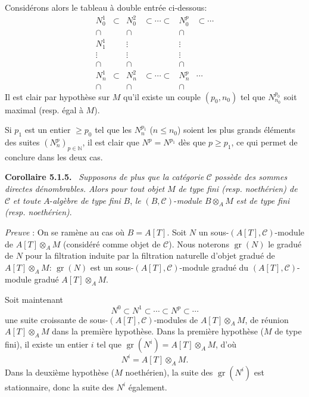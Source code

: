\documentclass[11pt]{article}
\newenvironment{statement}[1]{\par\medskip\noindent\textbf{#1.}\ }{\par\medskip}
\providecommand{\gr}{\operatorname{gr}}
\providecommand{\gr}{\operatorname{gr}}
\providecommand{\gr}{\operatorname{gr}}
\begin{document}
Considérons alors le tableau à double entrée ci-dessous:
\[
\begin{array}{cccccc}
N_0^1&\subset&N_0^2&\subset\cdots\subset&N_0^p&\subset\cdots\\
\cap&&\cap&&\cap\\
N_1^1&&\vdots&&\vdots\\
\vdots&&\vdots&&\vdots\\
\cap&&\cap&&\cap\\
N_n^1&\subset&N_n^2&\subset\cdots\subset&N_n^p&\cdots\\
\cap&&\cap&&\cap
\end{array}
\]
Il est clair par hypothèse sur \(M\) qu'il existe un couple \((p_0,n_0)\) tel que \(N^{p_0}_{n_0}\) soit maximal (resp. égal à \(M\)).

Si \(p_1\) est un entier \(\ge p_0\) tel que les \(N_n^{p_1}\) (\(n\le n_0\)) soient les plus grands éléments des suites \((N_n^p)_{p\in\mathbb N}\), il est clair que \(N^p=N^{p_1}\) dès que \(p\ge p_1\), ce qui permet de conclure dans les deux cas.

\begin{statement}{Corollaire 5.1.5}
\emph{Supposons de plus que la catégorie} \(\mathcal C\) \emph{possède des sommes directes dénombrables. Alors pour tout objet} \(M\) \emph{de type fini (resp. noethérien) de} \(\mathcal C\) \emph{et toute} \(A\)-\emph{algèbre de type fini} \(B\), \emph{le} \((B,\mathcal C)\)-\emph{module} \(B\otimes_A M\) \emph{est de type fini (resp. noethérien)}.
\end{statement}

\emph{Preuve} : On se ramène au cas où \(B=A[T]\). Soit \(N\) un sous-\((A[T],\mathcal C)\)-module de \(A[T]\otimes_A M\) (considéré comme objet de \(\mathcal C\)). Nous noterons \(\gr(N)\) le gradué de \(N\) pour la filtration induite par la filtration naturelle d'objet gradué de \(A[T]\otimes_A M\): \(\gr(N)\) est un sous-\((A[T],\mathcal C)\)-module gradué du \((A[T],\mathcal C)\)-module gradué \(A[T]\otimes_A M\).

Soit
maintenant
\[
N^0\subset N^1\subset\cdots\subset N^p\subset\cdots
\]
une suite croissante de sous-\((A[T],\mathcal C)\)-modules de \(A[T]\otimes_A M\), de réunion \(A[T]\otimes_A M\) dans la première hypothèse. Dans la première hypothèse (\(M\) de type fini), il existe un entier \(i\) tel que \(\gr(N^i)=A[T]\otimes_A M\), d'où
\[
N^i=A[T]\otimes_A M.
\]
Dans la deuxième hypothèse (\(M\) noethérien), la suite des \(\gr(N^i)\) est stationnaire, donc la suite des \(N^i\) également.
\end{document}
